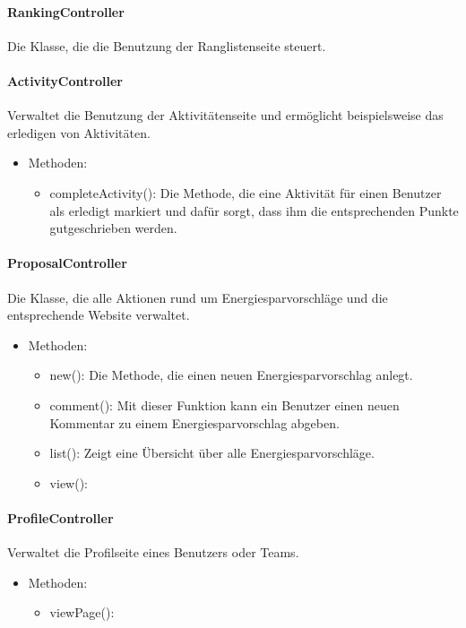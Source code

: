 	\paragraph{RankingController}Die Klasse, die die Benutzung der Ranglistenseite steuert.
	\paragraph{ActivityController}Verwaltet die Benutzung der Aktivit\"atenseite und erm\"oglicht beispielsweise das erledigen von Aktivit\"aten.
		\begin{itemize}
			\item Methoden:
			\begin{itemize}
				\item completeActivity(): Die Methode, die eine Aktivit\"at f\"ur einen Benutzer als erledigt markiert und daf\"ur sorgt, dass ihm die entsprechenden Punkte gutgeschrieben werden.
			\end{itemize}
		\end{itemize}
	\paragraph{ProposalController}Die Klasse, die alle Aktionen rund um Energiesparvorschl\"age und die entsprechende Website verwaltet.
		\begin{itemize}
			\item Methoden:
			\begin{itemize}
				\item new(): Die Methode, die einen neuen Energiesparvorschlag anlegt.
				\item comment(): Mit dieser Funktion kann ein Benutzer einen neuen Kommentar zu einem Energiesparvorschlag abgeben.
				\item list(): Zeigt eine \"Ubersicht \"uber alle Energiesparvorschl\"age.
				\item view(): %
			\end{itemize}
		\end{itemize}
	\paragraph{ProfileController}Verwaltet die Profilseite eines Benutzers oder Teams.
		\begin{itemize}
			\item Methoden:
			\begin{itemize}
				\item viewPage(): %
			\end{itemize}
		\end{itemize}
